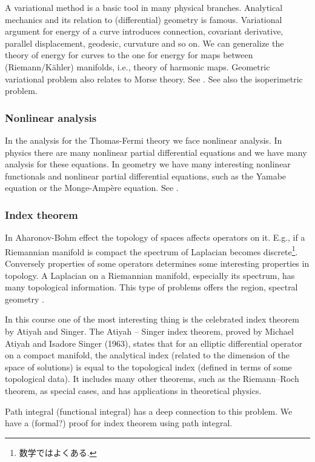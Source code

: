 \documentclass[openany, a4paper, oneside]{jsbook}
\begin{document}
A variational method is a basic tool in many physical branches.
Analytical mechanics and its relation to (differential) geometry is famous.
Variational argument for energy of a curve introduces connection,
covariant derivative, parallel displacement, geodesic, curvature and so on.
We can generalize the theory of energy for curves to the one for energy for maps between (Riemann/K\"ahler) manifolds,
i.e., theory of harmonic maps.
Geometric variational problem also relates to Morse theory.
See \cite{SeikiNishikawa1}.
See also the isoperimetric problem.
\subsubsection{Nonlinear analysis}

In the analysis for the Thomas-Fermi theory we face nonlinear analysis.
In physics there are many nonlinear partial differential equations
and we have many analysis for these equations.
In geometry we have many interesting nonlinear functionals and nonlinear partial differential equations,
such as the Yamabe equation or the Monge-Amp\`ere equation.
See \cite{ThierryAubin1}.
\subsubsection{Index theorem}

In Aharonov-Bohm effect the topology of spaces affects operators on it.
E.g., if a Riemannian manifold is compact the spectrum of Laplacian becomes discrete\footnote{数学ではよくある.}.
Conversely properties of some operators determines some interesting properties in topology.
A Laplacian on a Riemannian manifold, especially its spectrum, has many topological information.
This type of problems offers the region, spectral geometry \cite{MarkKac2}.

In this course one of the most interesting thing is the celebrated index theorem by Atiyah and Singer.
The Atiyah – Singer index theorem, proved by Michael Atiyah and Isadore Singer (1963),
states that for an elliptic differential operator on a compact manifold,
the analytical index (related to the dimension of the space of solutions) is equal to
the topological index (defined in terms of some topological data).
It includes many other theorems,
such as the Riemann–Roch theorem, as special cases, and has applications in theoretical physics.

Path integral (functional integral) has a deep connection to this problem.
We have a (formal?) proof for index theorem using path integral.
\end{document}
